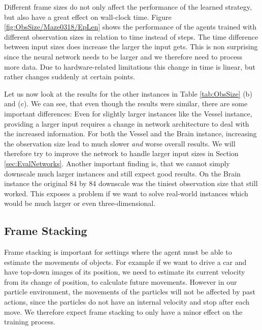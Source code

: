 Different frame sizes do not only affect the performance of the learned strategy, but also have a great effect on wall-clock time. Figure \ref{fig:ObsSize/Maze0318/EpLen} shows the performance of the agents trained with different observation sizes in relation to time instead of steps. The time difference between input sizes does increase the larger the input gets. This is non surprising since the neural network needs to be larger and we therefore need to process more data. Due to hardware-related limitations this change in time is linear, but rather changes suddenly at certain points.

Let us now look at the results for the other instances in Table \ref{tab:ObsSize} (b) and (c). We can see, that even though the results were similar, there are some important differences: Even for slightly larger instances like the Vessel instance, providing a larger input requires a change in network architecture to deal with the increased information. For both the Vessel and the Brain instance, increasing the observation size lead to much slower \textit{and} worse overall results. We will therefore try to improve the network to handle larger input sizes in Section \ref{sec:EvalNetworks}. Another important finding is, that we cannot simply downscale much larger instances and still expect good results. On the Brain instance the original 84 by 84 downscale was the tiniest observation size that still worked. This exposes a problem if we want to solve real-world instances which would be much larger or even three-dimensional. 


\subsection{Frame Stacking} \label{sec:Eval/FrameStack}
Frame stacking is important for settings where the agent must be able to estimate the movements of objects. For example if we want to drive a car and have top-down images of its position, we need to estimate its current velocity from its change of position, to calculate future movements. However in our particle environment, the movements of the particles will not be affected by past actions, since the particles do not have an internal velocity and stop after each move. We therefore expect frame stacking to only have a minor effect on the training process.   

